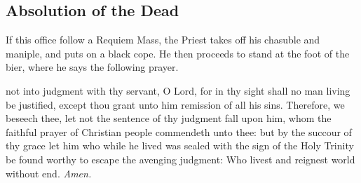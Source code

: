 \subsection{Absolution of the Dead}     
\begin{rubric}
	If this office follow a Requiem Mass, the Priest takes off his chasuble and maniple, and puts on a black cope. He then proceeds to stand at the foot of the bier, where he says the following prayer.
\end{rubric}


 not into judgment with thy servant, O Lord, for in thy sight shall no man living be justified, except thou grant unto him remission of all his sins. Therefore, we beseech thee, let not the sentence of thy judgment fall upon him, whom the faithful prayer of Christian people commendeth unto thee: but by the succour of thy grace let him who while he lived was sealed with the sign of the Holy Trinity be found worthy to escape the avenging judgment: Who livest and reignest world without end. \textit{Amen.}

